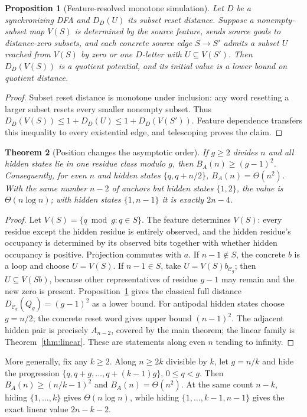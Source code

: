 \documentclass[11pt]{article}
\newtheorem{theorem}{Theorem}
\newtheorem{proposition}[theorem]{Proposition}
\newcommand{\C}{\mathcal C}
\begin{document}
\begin{proposition}[Feature-resolved monotone simulation]\label{prop:sim}
Let $D$ be a synchronizing DFA and $D_D(U)$ its subset reset distance.
Suppose a nonempty-subset map $V(S)$ is determined by the source feature,
sends source goals to distance-zero subsets, and each concrete source
edge $S\to S'$ admits a subset $U$ reached from $V(S)$ by zero or one
$D$-letter with $U\subseteq V(S')$. Then $D_D(V(S))$ is a quotient
potential, and its initial value is a lower bound on quotient distance.
\end{proposition}
\begin{proof}
Subset reset distance is monotone under inclusion: any word resetting a
larger subset resets every smaller nonempty subset. Thus
$D_D(V(S))\le1+D_D(U)\le1+D_D(V(S'))$. Feature dependence transfers this
inequality to every existential edge, and telescoping proves the claim.
\end{proof}

\begin{theorem}[Position changes the asymptotic order]
If $g\ge2$ divides $n$ and all hidden states lie in one residue class
modulo $g$, then $B_A(n)\ge(g-1)^2$.
Consequently, for even $n$ and hidden states $\{q,q+n/2\}$,
$B_A(n)=\Theta(n^2)$. With the same number $n-2$ of anchors but hidden
states $\{1,2\}$, the value is $\Theta(n\log n)$; with hidden states
$\{1,n-1\}$ it is exactly $2n-4$.
\end{theorem}
\begin{proof}
Let $V(S)=\{q\bmod g:q\in S\}$. The feature determines $V(S)$:
every residue except the hidden residue is entirely observed, and the
hidden residue's occupancy is determined by its observed bits together
with whether hidden occupancy is positive. Projection commutes with $a$.
If $n-1\notin S$, the concrete $b$ is a loop and choose $U=V(S)$.
If $n-1\in S$, take $U=V(S)b_{\C_g}$; then $U\subseteq V(Sb)$, because
other representatives of residue $g-1$ may remain and the new zero is
present. Proposition~\ref{prop:sim} gives the classical full distance
$D_{\C_g}(Q_g)=(g-1)^2$ as a lower bound. For antipodal hidden states
choose $g=n/2$; the concrete reset word gives upper bound $(n-1)^2$.
The adjacent hidden pair is precisely $A_{n-2}$, covered by the main
theorem; the linear family is Theorem~\ref{thm:linear}. These are statements
along even $n$ tending to infinity.
\end{proof}
More generally, fix any $k\ge2$. Along $n\ge2k$ divisible by $k$, let $g=n/k$
and hide the progression $\{q,q+g,\ldots,q+(k-1)g\}$, $0\le q<g$.
Then $B_A(n)\ge(n/k-1)^2$ and $B_A(n)=\Theta(n^2)$. At the same count
$n-k$, hiding $\{1,\ldots,k\}$ gives $\Theta(n\log n)$, while hiding
$\{1,\ldots,k-1,n-1\}$ gives the exact linear value $2n-k-2$.
\end{document}
